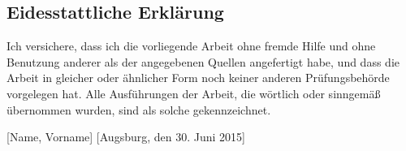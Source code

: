 \begin{appendix}


\newpage
\section{Eidesstattliche Erkl\"arung}
Ich versichere, dass ich die vorliegende Arbeit ohne fremde Hilfe und ohne Benutzung anderer als der angegebenen Quellen angefertigt habe, und dass die Arbeit in gleicher oder \"ahnlicher Form noch keiner anderen Prüfungsbeh\"orde vorgelegen hat. Alle Ausf\"uhrungen der Arbeit, die w\"ortlich oder sinngem\"a\ss{} \"ubernommen wurden, sind als solche gekennzeichnet.

\vspace{1em}

[Name, Vorname]
[Augsburg, den 30. Juni 2015]

\end{appendix}